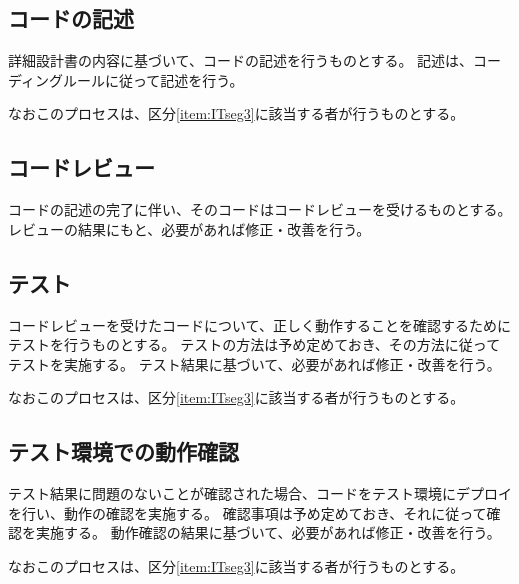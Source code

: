 \subsection{コードの記述}
詳細設計書の内容に基づいて、コードの記述を行うものとする。
記述は、コーディングルールに従って記述を行う。

なおこのプロセスは、区分\ref{item:ITseg3}\hx に該当する者が行うものとする。

\subsection{コードレビュー}
コードの記述の完了に伴い、そのコードはコードレビューを受けるものとする。
レビューの結果にもと、必要があれば修正・改善を行う。

\subsection{テスト}
コードレビューを受けたコードについて、正しく動作することを確認するためにテストを行うものとする。
テストの方法は予め定めておき、その方法に従ってテストを実施する。
テスト結果に基づいて、必要があれば修正・改善を行う。

なおこのプロセスは、区分\ref{item:ITseg3}\hx に該当する者が行うものとする。

\clearpage
\subsection{テスト環境での動作確認}
テスト結果に問題のないことが確認された場合、コードをテスト環境にデプロイを行い、動作の確認を実施する。
確認事項は予め定めておき、それに従って確認を実施する。
動作確認の結果に基づいて、必要があれば修正・改善を行う。

なおこのプロセスは、区分\ref{item:ITseg3}\hx に該当する者が行うものとする。

